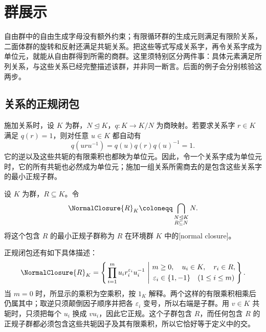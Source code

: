 
\section{群展示}
\label{b1:sec:0802}

自由群中的自由生成字母没有额外约束；有限循环群的生成元则满足有限阶关系，二面体群的旋转和反射还满足共轭关系。把这些等式写成关系字，再令关系字成为单位元，就能从自由群得到所需的商群。这里须特别区分两件事：具体元素满足所列关系，与这些关系已经完整描述该群，并非同一断言。后面的例子会分别核验这两步。

%
%

\subsection{关系的正规闭包}
\label{b1:subsec:0802:01}

施加关系时，设 \(K\) 为群，\(N\trianglelefteq K\)，\(q:K\to K/N\) 为商映射。若要求关系字 \(r\in K\) 满足 \(q(r)=1\)，则对任意 \(u\in K\) 都自动有
\[
	q(uru^{-1})=q(u)q(r)q(u)^{-1}=1.
\]
它的逆以及这些共轭的有限乘积也都映为单位元。因此，令一个关系字成为单位元时，它的所有共轭也必然成为单位元；施加一组关系所需商去的是包含这些关系字的最小正规子群。

\begin{definition}\label{b1:def:normal-closure}
	设 \(K\) 为群，\(R\subseteq K\)。令
	\[
		\NormalClosure{R}_{K} \coloneqq \bigcap_{\substack{N\trianglelefteq K\\R\subseteq N}}N.
	\]
	将这个包含 \(R\) 的最小正规子群称为 \(R\) 在环境群 \(K\) 中的[normal closure]。
\end{definition}

正规闭包还有如下具体描述：
\[
	\NormalClosure{R}_{K} =\left\{\, \prod_{i=1}^m u_i r_i^{\varepsilon_i}u_i^{-1} \ \middle|\
	\begin{gathered}
		m\geq0,\quad u_i\in K,\quad r_i\in R,\\
		\varepsilon_i\in\{1,-1\}\quad(1\leq i\leq m)
	\end{gathered}
	\,\right\}.
\]
当 \(m=0\) 时，所显示的乘积为空乘积，按 \(1_K\) 解释。两个这样的有限乘积相乘后仍属其中；取逆只须颠倒因子顺序并把各 \(\varepsilon_i\) 变号，所以右端是子群。用 \(v\in K\) 共轭时，只须把每个 \(u_i\) 换成 \(vu_i\)，因此它正规。这个子群包含 \(R\)，而任何包含 \(R\) 的正规子群都必须包含这些共轭因子及其有限乘积，所以它恰好等于定义中的交。

